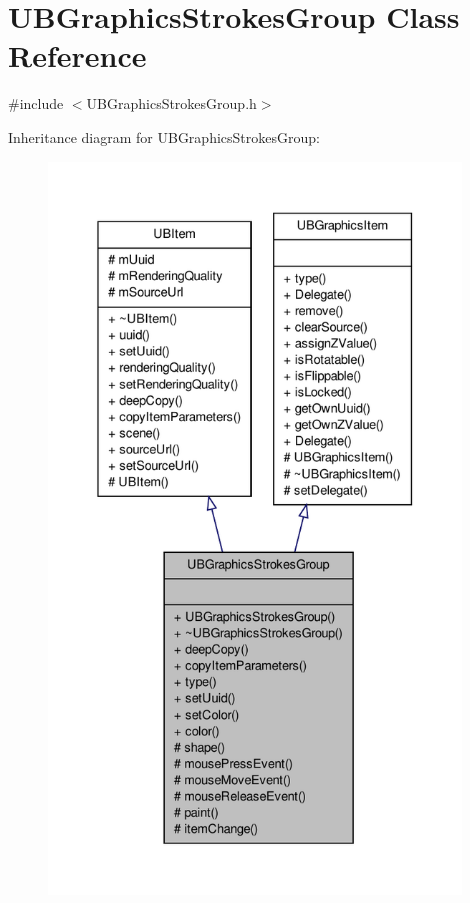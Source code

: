 \hypertarget{class_u_b_graphics_strokes_group}{\section{U\-B\-Graphics\-Strokes\-Group Class Reference}
\label{d3/d0b/class_u_b_graphics_strokes_group}
}


{\ttfamily \#include $<$U\-B\-Graphics\-Strokes\-Group.\-h$>$}



Inheritance diagram for U\-B\-Graphics\-Strokes\-Group\-:
\nopagebreak
\begin{figure}[H]
\begin{center}
\leavevmode
\includegraphics[height=550pt]{d0/d36/class_u_b_graphics_strokes_group__inherit__graph}
\end{center}
\end{figure}


